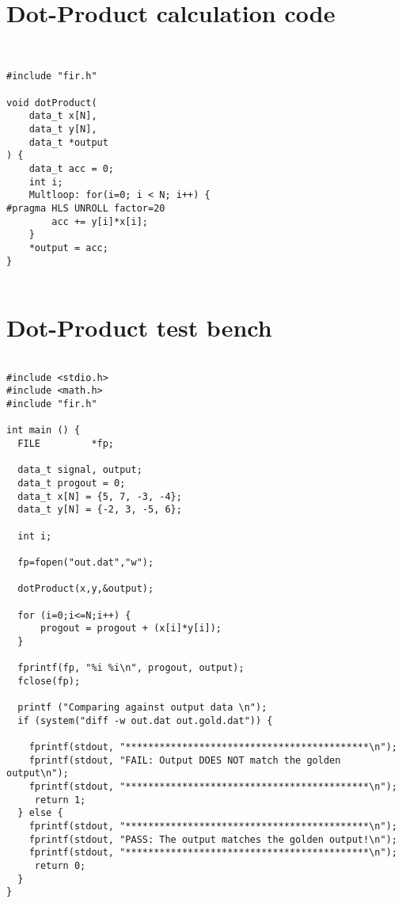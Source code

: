 \section{Dot-Product calculation code}
\lstset{language=C++}
\begin{lstlisting}


#include "fir.h"

void dotProduct(
    data_t x[N],
    data_t y[N],
    data_t *output
) {
    data_t acc = 0;
    int i;
    Multloop: for(i=0; i < N; i++) {
#pragma HLS UNROLL factor=20
        acc += y[i]*x[i];
    }
    *output = acc;
}


\end{lstlisting}

\section{Dot-Product test bench}
\lstset{language=C++}
\begin{lstlisting}

#include <stdio.h>
#include <math.h>
#include "fir.h"

int main () {
  FILE         *fp;

  data_t signal, output;
  data_t progout = 0;
  data_t x[N] = {5, 7, -3, -4};
  data_t y[N] = {-2, 3, -5, 6};

  int i;
  
  fp=fopen("out.dat","w");

  dotProduct(x,y,&output);

  for (i=0;i<=N;i++) {
      progout = progout + (x[i]*y[i]);
  }

  fprintf(fp, "%i %i\n", progout, output);
  fclose(fp);
  
  printf ("Comparing against output data \n");
  if (system("diff -w out.dat out.gold.dat")) {

    fprintf(stdout, "*******************************************\n");
    fprintf(stdout, "FAIL: Output DOES NOT match the golden output\n");
    fprintf(stdout, "*******************************************\n");
     return 1;
  } else {
    fprintf(stdout, "*******************************************\n");
    fprintf(stdout, "PASS: The output matches the golden output!\n");
    fprintf(stdout, "*******************************************\n");
     return 0;
  }
}

\end{lstlisting}

